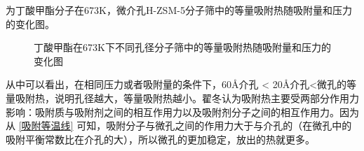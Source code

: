 \par{为丁酸甲酯分子在673K，微介孔H-ZSM-5分子筛中的等量吸附热随吸附量和压力的变化图。}
\begin{figure}[H]
    \centering

    \caption{丁酸甲酯在673K下不同孔径分子筛中的等量吸附热随吸附量和压力的变化图}
    \label{fig:sH1}
\end{figure}
\par{从中可以看出，在相同压力或者吸附量的条件下，60Å介孔 < 20Å介孔<微孔的等量吸附热，说明孔径越大，等量吸附热越小。翟冬\cite{翟冬2011C4}认为吸附热主要受两部分作用力影响：吸附质与吸附剂之间的相互作用力以及吸附剂分子之间的相互作用力。因为从 \ref{吸附等温线} 可知，吸附分子与微孔之间的作用力大于与介孔的（在微孔中的吸附平衡常数比在介孔的大），所以微孔的更加稳定，放出的热就更多。}
